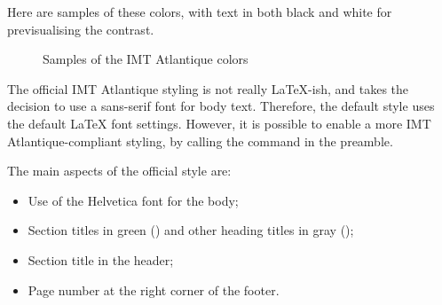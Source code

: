 \documentclass{report}
\begin{document}
Here are samples of these colors, with text in both black and white for previsualising the contrast.

\begin{figure}[H]
    \centering
    \caption{Samples of the IMT Atlantique colors}
    \label{fig:imtaColors}
\end{figure}


The official IMT Atlantique styling is not really \LaTeX-ish, and takes the decision to use a sans-serif font for body text.
Therefore, the default style uses the default \LaTeX{} font settings.
However, it is possible to enable a more IMT Atlantique-compliant styling, by calling the  command in the preamble.

\vspace{1em}
The main aspects of the official style are:

\begin{itemize}
    \item Use of the Helvetica font for the body;
    \item Section titles in green () and other heading titles in gray ();
    \item Section title in the header;
    \item Page number at the right corner of the footer.
\end{itemize}
\end{document}

